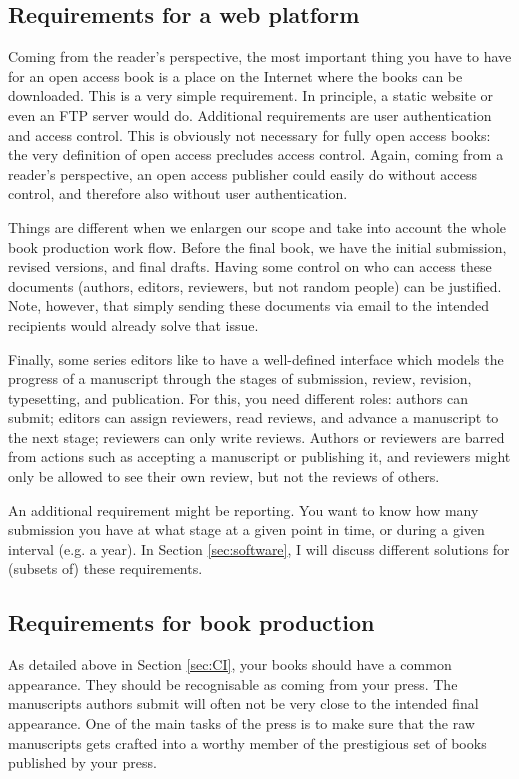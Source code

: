 \documentclass[guidelines,nonflat,modfonts] {langsci/langscibook}
\begin{document}
\subsection{Requirements for a web platform}
Coming from the reader's perspective, the most important thing you have to have for an open access book is a place on the Internet where the books can be downloaded. This is a very simple requirement. In principle, a static website or even an FTP server would do. Additional requirements are user authentication and access control. This is obviously not necessary for fully open access books: the very definition of open access precludes access control. Again, coming from a reader's perspective, an open access publisher could easily do without access control, and therefore also without user authentication. 

Things are different when we enlargen our scope and take into account the whole book production work flow. Before the final book, we have the initial submission, revised versions, and final drafts. Having some control on who can access these documents (authors, editors, reviewers, but not random people) can be justified. Note, however, that simply sending these documents via email to the intended recipients would already solve that issue.

Finally, some series editors like to have a well-defined interface which models the progress of a manuscript through the stages of submission, review, revision, typesetting, and publication. For this, you need different roles: authors can submit; editors can assign reviewers, read reviews, and advance a manuscript to the next stage; reviewers can only write reviews. Authors or reviewers are barred from actions such as accepting a manuscript or publishing it, and reviewers might only be allowed to see their own review, but not the reviews of others. 

An additional requirement might be reporting. You want to know how many submission you have at what stage at a given point in time, or during a given interval (e.g. a year). In Section \ref{sec:software}, I will discuss different solutions for (subsets of) these requirements. 
 
 
\subsection{Requirements for book production}
As detailed above in Section \ref{sec:CI}, your books should have a common appearance. They should be recognisable as coming from your press. The manuscripts authors submit will often not be very close to the intended final appearance. One of the main tasks of the press is to make sure that the raw manuscripts gets crafted into a worthy member of the prestigious set of books published by your press. 
\end{document}
